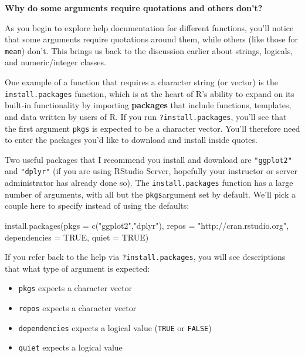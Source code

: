 \documentclass[]{tufte-book}
\newenvironment{Shaded}{\begin{snugshade}}{\end{snugshade}}
\newcommand{\AttributeTok}[1]{\textcolor[rgb]{0.77,0.63,0.00}{#1}}
\newcommand{\ConstantTok}[1]{\textcolor[rgb]{0.00,0.00,0.00}{#1}}
\newcommand{\FunctionTok}[1]{\textcolor[rgb]{0.00,0.00,0.00}{#1}}
\newcommand{\NormalTok}[1]{#1}
\newcommand{\StringTok}[1]{\textcolor[rgb]{0.31,0.60,0.02}{#1}}
\providecommand{\tightlist}{%
  \setlength{\itemsep}{0pt}\setlength{\parskip}{0pt}}
\begin{document}
\vspace*{0.2in}

\noindent\textbf{Why do some arguments require quotations and others don't?}\vspace*{0.1in}

As you begin to explore help documentation for different functions, you'll notice that some arguments require quotations around them, while others (like those for \texttt{mean}) don't. This brings us back to the discussion earlier about strings, logicals, and numeric/integer classes.

One example of a function that requires a character string (or vector) is the \texttt{install.packages} function, which is at the heart of R's ability to expand on its built-in functionality by importing \textbf{packages} that include functions, templates, and data written by users of R. If you run \texttt{?install.packages}, you'll see that the first argument \texttt{pkgs} is expected to be a character vector. You'll therefore need to enter the packages you'd like to download and install inside quotes.

Two useful packages that I recommend you install and download are \texttt{"ggplot2"} and \texttt{"dplyr"} (if you are using RStudio Server, hopefully your instructor or server administrator has already done so). The \texttt{install.packages} function has a large number of arguments, with all but the \texttt{pkgs}argument set by default. We'll pick a couple here to specify instead of using the defaults:

\begin{Shaded}
\begin{Highlighting}[]
\FunctionTok{install.packages}\NormalTok{(}\AttributeTok{pkgs =} \FunctionTok{c}\NormalTok{(}\StringTok{"ggplot2"}\NormalTok{,}\StringTok{"dplyr"}\NormalTok{),}
         \AttributeTok{repos =} \StringTok{"http://cran.rstudio.org"}\NormalTok{,}
         \AttributeTok{dependencies =} \ConstantTok{TRUE}\NormalTok{,}
         \AttributeTok{quiet =} \ConstantTok{TRUE}\NormalTok{)}
\end{Highlighting}
\end{Shaded}

If you refer back to the help via \texttt{?install.packages}, you will see descriptions that what type of argument is expected:

\begin{itemize}
\tightlist
\item
  \texttt{pkgs} expects a character vector
\item
  \texttt{repos} expects a character vector
\item
  \texttt{dependencies} expects a logical value (\texttt{TRUE} or \texttt{FALSE})
\item
  \texttt{quiet} expects a logical value
\end{itemize}
\end{document}
